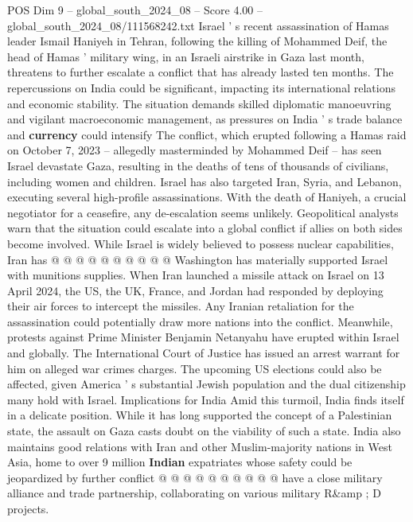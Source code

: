 \begin{textsample}{POS Dim 9 – global\_south\_2024\_08 – Score 4.00 – global\_south\_2024\_08/111568242.txt}  \label{ex:f9_pos_055}
Israel ' s recent assassination of Hamas leader Ismail Haniyeh in Tehran, following the killing of Mohammed Deif, the head of Hamas ' military wing, in an Israeli airstrike in Gaza last month, threatens to further escalate a conflict that has already lasted ten months.
The repercussions on India could be significant, impacting its international relations and economic stability.
The situation demands skilled diplomatic manoeuvring and vigilant macroeconomic management, as pressures on India ' s trade balance and \textbf{currency} could intensify The conflict, which erupted following a Hamas raid on October 7, 2023 -- allegedly masterminded by Mohammed Deif -- has seen Israel devastate Gaza, resulting in the deaths of tens of thousands of civilians, including women and children.
Israel has also targeted Iran, Syria, and Lebanon, executing several high-profile assassinations.
With the death of Haniyeh, a crucial negotiator for a ceasefire, any de-escalation seems unlikely.
Geopolitical analysts warn that the situation could escalate into a global conflict if allies on both sides become involved.
While Israel is widely believed to possess nuclear capabilities, Iran has @ @ @ @ @ @ @ @ @ @ Washington has materially supported Israel with munitions supplies.
When Iran launched a missile attack on Israel on 13 April 2024, the US, the UK, France, and Jordan had responded by deploying their air forces to intercept the missiles.
Any Iranian retaliation for the assassination could potentially draw more nations into the conflict.
Meanwhile, protests against Prime Minister Benjamin Netanyahu have erupted within Israel and globally.
The International Court of Justice has issued an arrest warrant for him on alleged war crimes charges.
The upcoming US elections could also be affected, given America ' s substantial Jewish population and the dual citizenship many hold with Israel.
Implications for India Amid this turmoil, India finds itself in a delicate position.
While it has long supported the concept of a Palestinian state, the assault on Gaza casts doubt on the viability of such a state.
India also maintains good relations with Iran and other Muslim-majority nations in West Asia, home to over 9 million \textbf{Indian} expatriates whose safety could be jeopardized by further conflict @ @ @ @ @ @ @ @ @ @ have a close military alliance and trade partnership, collaborating on various military R\&amp ; D projects.

\end{textsample}
